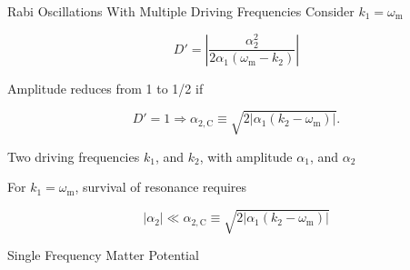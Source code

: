 \documentclass[9pt]{beamer}
\begin{document}
\begin{darkframes}
\begin{frame}{Rabi Oscillations With Multiple Driving Frequencies}
Consider $k_1=\omega_{\mathrm m}$

\begin{equation*}
D' =  \left\vert \frac{\alpha_2^2}{2\alpha_1(\omega_{\mathrm m}-k_2)} \right\vert
\end{equation*}

Amplitude reduces from 1 to 1/2 if

\begin{equation*}
    D'=1 \Rightarrow \alpha_{2,\mathrm C} \equiv \sqrt{ 2 \lvert \alpha_1 (k_2 - \omega_{\mathrm m}) \rvert }.
\end{equation*}


\vspace{2em}

\begin{tcolorbox}
Two driving frequencies $k_1$, and $k_2$, with amplitude $\alpha_1$, and $\alpha_2$

For $k_1 = \omega_{\mathrm m}$, survival of resonance requires

\begin{equation*}
    \lvert \alpha_2\rvert \ll  \alpha_{2,\mathrm C}\equiv\sqrt{ 2 \lvert \alpha_1 (k_2 - \omega_{\mathrm m}) \rvert }
\end{equation*}

\end{tcolorbox}






\end{frame}









\begin{frame}{Single Frequency Matter Potential}




\end{frame}
\end{darkframes}
\end{document}
